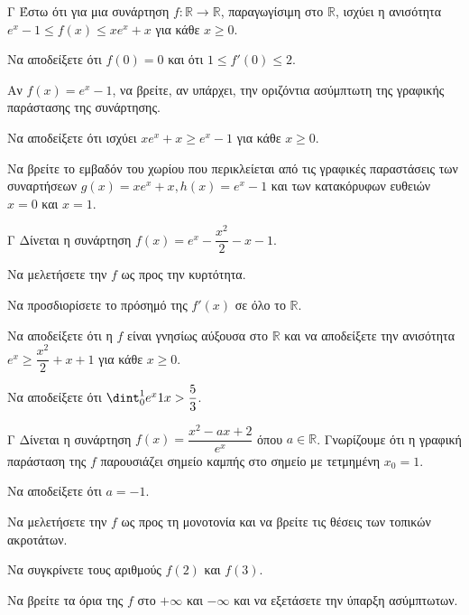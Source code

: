 \begin{thema}{Γ}
Έστω ότι για μια συνάρτηση $f: \mathbb{R} \to \mathbb{R}$, παραγωγίσιμη στο $\mathbb{R}$, ισχύει η ανισότητα $e^x - 1 \le f(x) \le x e^x + x$ για κάθε $x \ge 0$.
\begin{erwthma}
  \item Να αποδείξετε ότι $f(0) = 0$ και ότι $1 \le f'(0) \le 2$.
  \item Αν $f(x) = e^x - 1$, να βρείτε, αν υπάρχει, την οριζόντια ασύμπτωτη της γραφικής παράστασης της συνάρτησης.
  \item Να αποδείξετε ότι ισχύει $xe^x + x \ge e^x - 1$ για κάθε $x \ge 0$.
  \item Να βρείτε το εμβαδόν του χωρίου που περικλείεται από τις γραφικές παραστάσεις των συναρτήσεων $g(x) = xe^x + x, h(x) = e^x - 1$ και των κατακόρυφων ευθειών $x=0$ και $x=1$.
\end{erwthma}
\end{thema}

\begin{thema}{Γ}
Δίνεται η συνάρτηση $f(x) = e^x - \dfrac{x^2}{2} - x - 1$.
\begin{erwthma}
  \item Να μελετήσετε την $f$ ως προς την κυρτότητα.
  \item Να προσδιορίσετε το πρόσημό της $f'(x)$ σε όλο το $\mathbb{R}$.
  \item Να αποδείξετε ότι η $f$ είναι γνησίως αύξουσα στο $\mathbb{R}$ και να αποδείξετε την ανισότητα $e^x \ge \dfrac{x^2}{2} + x + 1$ για κάθε $x \ge 0$.
  \item Να αποδείξετε ότι $\dint_0^1 e^x \d x > \dfrac{5}{3}$.
\end{erwthma}
\end{thema}

\begin{thema}{Γ}
Δίνεται η συνάρτηση $f(x) = \dfrac{x^2 - a x + 2}{e^x}$ όπου $a \in \mathbb{R}$. Γνωρίζουμε ότι η γραφική παράσταση της $f$ παρουσιάζει σημείο καμπής στο σημείο με τετμημένη $x_0 = 1$.
\begin{erwthma}
  \item Να αποδείξετε ότι $a = -1$.
  \item Να μελετήσετε την $f$ ως προς τη μονοτονία και να βρείτε τις θέσεις των τοπικών ακροτάτων.
  \item Να συγκρίνετε τους αριθμούς $f(2)$ και $f(3)$. 
  \item Να βρείτε τα όρια της $f$ στο $+\infty$ και $-\infty$ και να εξετάσετε την ύπαρξη ασύμπτωτων.
\end{erwthma}
\end{thema}

